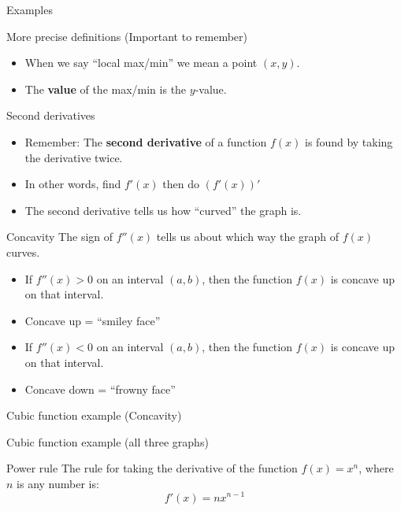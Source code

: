 \documentclass[t]{beamer}
\begin{document}
\begin{frame}{Examples}
\end{frame}

\begin{frame}{More precise definitions (Important to remember)}
\begin{itemize} 
\item When we say ``local max/min'' we mean a point $(x,y)$.
\item The \textbf{value} of the max/min is the $y$-value.
\end{itemize}
\end{frame}

\begin{frame}{Second derivatives}
\begin{itemize}
\item Remember: The \textbf{second derivative} of a function $f(x)$ is found by taking the derivative twice.
\item In other words, find $f'(x)$ then do $(f'(x))'$
\item The second derivative tells us how ``curved'' the graph is.
\end{itemize}
\end{frame}

\begin{frame}{Concavity}
The sign of $f''(x)$ tells us about which way the graph of $f(x)$ curves.
\begin{itemize}
\item If $f''(x) > 0$ on an interval $(a,b)$, then the function $f(x)$ is concave up on that interval.
\item Concave up = ``smiley face''
\item If $f''(x) < 0$ on an interval $(a,b)$, then the function $f(x)$ is concave up on that interval.
\item Concave down = ``frowny face''
\end{itemize}
\end{frame}

\begin{frame}{Cubic function example (Concavity)}
\end{frame}

\begin{frame}{Cubic function example (all three graphs)}
\end{frame}

\begin{frame}{Power rule}
The rule for taking the derivative of the function $f(x) = x^n$,
where $n$ is any number is:
$$ f'(x) = n x^{n-1}$$
\end{frame}
\end{document}
